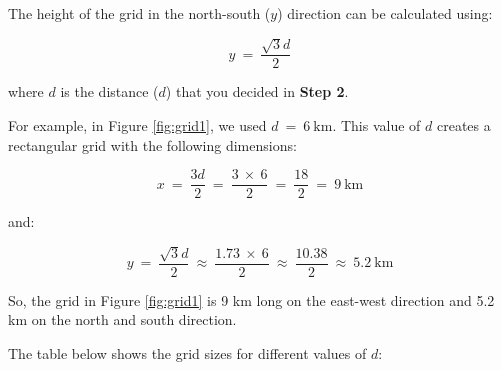 \documentclass[12pt,a4paper]{book}
\theoremstyle{definition}
\theoremstyle{definition}
\theoremstyle{definition}
\theoremstyle{remark}
\begin{document}
The height of the grid in the north-south (\(y\)) direction can be
calculated using:

\[ y ~ = ~ \frac{\sqrt{3}d}{2} \]

where \(d\) is the distance (\(d\)) that you decided in \textbf{Step 2}.

For example, in Figure \ref{fig:grid1}, we used
\(d ~ = ~ 6 ~ \text{km}\). This value of \(d\) creates a rectangular
grid with the following dimensions:

\[ x ~ = ~ \frac{3d}{2} ~ = ~ \frac{3 ~ \times ~ 6}{2} ~ = ~ \frac{18}{2} ~ = ~ 9 ~ \text{km} \]

and:

\[ y ~ = ~ \frac{\sqrt{3}d}{2} ~ \approx ~ \frac{1.73 ~ \times ~ 6}{2} ~ \approx ~ \frac{10.38}{2} ~ \approx ~ 5.2 ~ \text{km} \]

So, the grid in Figure \ref{fig:grid1} is 9 km long on the east-west
direction and 5.2 km on the north and south direction.

\newpage

The table below shows the grid sizes for different values of \(d\):
\end{document}
